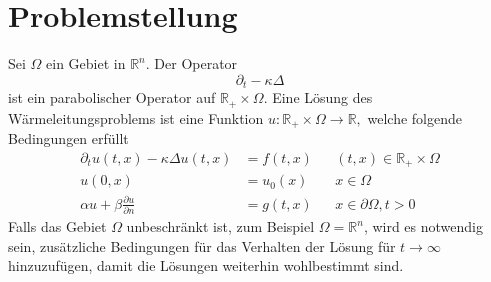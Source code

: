 %
%
%
\section{Problemstellung}
Sei $\Omega$ ein Gebiet in $\mathbb R^n$. Der Operator 
\[
\partial_t-\kappa\Delta
\]
ist ein parabolischer Operator auf $\mathbb R_+\times \Omega$.
Eine Lösung des Wärmeleitungsproblems ist eine Funktion
$u\colon\mathbb R_+\times\Omega\to\mathbb R,$
welche folgende Bedingungen erfüllt
\begin{align*}
\partial_tu(t,x)-\kappa\Delta u(t,x)&=f(t,x)&&(t,x)\in\mathbb R_+\times\Omega
\\
u(0,x)&=u_0(x)&&x\in\Omega
\\
\alpha u+\beta\frac{\partial u}{\partial n}&=g(t, x)&&x\in\partial\Omega, t>0
\end{align*}
Falls das Gebiet $\Omega$ unbeschränkt ist, zum Beispiel $\Omega=\mathbb R^n$,
wird es notwendig sein, zusätzliche Bedingungen für das Verhalten
der Lösung für $t\to\infty$ hinzuzufügen, damit die Lösungen weiterhin
wohlbestimmt sind.

